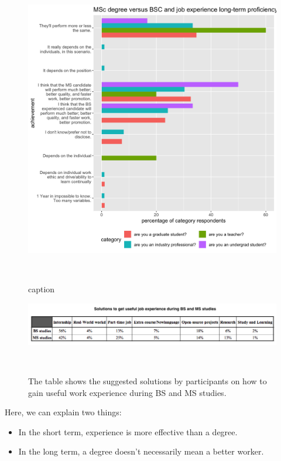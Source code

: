 \documentclass{sigchi}
\begin{document}
\begin{figure}
\includegraphics[scale=0.2]{../data-analysis/plots_output/MSc_degree_versus_BSC_and_job_experience_long-term_proficiency.png}
 \caption{caption}~\label{fig:figure11}
\end{figure}


\begin{figure}
  \centering
  \includegraphics[width=1.75\columnwidth]{../data-analysis/plots_output/Solutions_to_gain_useful_job_experience.png}
  \caption{The table shows the suggested solutions by participants on how to gain useful work experience during BS and MS studies.}~\label{fig:figure12}
\end{figure}

Here, we can explain two things:
\begin{itemize}
	\item In the short term, experience is more effective than a degree.
	\item In the long term, a degree doesn't necessarily mean a better worker.	
\end{itemize}
\end{document}
